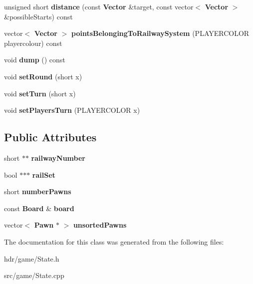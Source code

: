 \begin{DoxyCompactItemize}
\item 
unsigned short {\bfseries distance} (const {\bf Vector} \&target, const vector$<$ {\bf Vector} $>$ \&possible\-Starts) const \label{class_state_adbb160a96efbc5fde9c7346bafe26988}

\item 
vector$<$ {\bf Vector} $>$ {\bfseries points\-Belonging\-To\-Railway\-System} (P\-L\-A\-Y\-E\-R\-C\-O\-L\-O\-R playercolour) const \label{class_state_a8797cce1b552bfb36f01cc8fba0f7e48}

\item 
void {\bfseries dump} () const \label{class_state_a27499f3070aef89461dbec0c99a24225}

\item 
void {\bfseries set\-Round} (short x)\label{class_state_a468eb35199b879f9df58245540ca849c}

\item 
void {\bfseries set\-Turn} (short x)\label{class_state_a5f8cd95cb039eb5333a9fed80b7efd2f}

\item 
void {\bfseries set\-Players\-Turn} (P\-L\-A\-Y\-E\-R\-C\-O\-L\-O\-R x)\label{class_state_a100c1959a9c60fdcd3400a3fda247588}

\end{DoxyCompactItemize}
\subsection*{Public Attributes}
\begin{DoxyCompactItemize}
\item 
short $\ast$$\ast$ {\bfseries railway\-Number}\label{class_state_aa894bfd06fe70d41f14527401d752bd6}

\item 
bool $\ast$$\ast$$\ast$ {\bfseries rail\-Set}\label{class_state_a06eec6ac8f191d3b7e6bfc85426e37c6}

\item 
short {\bfseries number\-Pawns}\label{class_state_a2bd881ff696f2807e54a4cc0b522f624}

\item 
const {\bf Board} \& {\bfseries board}\label{class_state_a74702298b35b8a798e85212bccff6daa}

\item 
vector$<$ {\bf Pawn} $\ast$ $>$ {\bfseries unsorted\-Pawns}\label{class_state_a7da42bb202d9bb967db82e1b8c65070e}

\end{DoxyCompactItemize}


The documentation for this class was generated from the following files\-:\begin{DoxyCompactItemize}
\item 
hdr/game/State.\-h\item 
src/game/State.\-cpp\end{DoxyCompactItemize}
